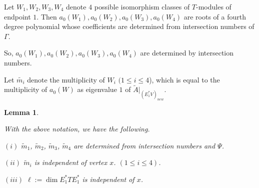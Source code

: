 \documentclass[
]{book}
\newtheorem{lemma}{Lemma}[chapter]
\theoremstyle{definition}
\theoremstyle{definition}
\theoremstyle{definition}
\theoremstyle{definition}
\theoremstyle{remark}
\begin{document}
Let \(W_1, W_2, W_3, W_4\) denote \(4\) possible isomorphism classes of \(T\)-modules of endpoint \(1\). Then \(a_0(W_1), a_0(W_2), a_0(W_3), a_0(W_4)\) are roots of a fourth degree polynomial whose coefficients are determined from intersection numbers of \(\Gamma\).

So, \(a_0(W_1), a_0(W_2), a_0(W_3), a_0(W_4)\) are determined by intersection numbers.

Let \(\widetilde{m_i}\) denote the multiplicity of \(W_i\) \((1\leq i\leq 4\)), which is equal to the multiplicity of \(a_0(W)\) as eigenvalue \(1\) of \(\tilde{A}|_{(E^*_1V)_{new}}\).

\begin{lemma}
\protect\hypertarget{lem:tilde-mi}{}\label{lem:tilde-mi}

With the above notation, we have the following.

\((i)\) \(\tilde{m}_1\), \(\tilde{m}_2\), \(\tilde{m}_3\), \(\tilde{m}_4\) are determined from intersection numbers and \(\Psi\).

\((ii)\) \(\tilde{m}_i\) is independent of vertex \(x\). \((1\leq i\leq 4)\).

\((iii)\) \(\ell:= \dim E^*_1TE^*_1\) is independent of \(x\).

\end{lemma}
\end{document}

